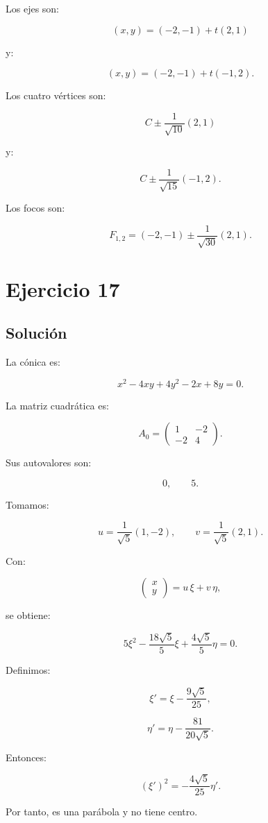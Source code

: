 \documentclass[11pt,a4paper]{article}
\begin{document}
Los ejes son:

\[
\boxed{
(x,y)
=
(-2,-1)
+
t(2,1)
}
\]

y:

\[
\boxed{
(x,y)
=
(-2,-1)
+
t(-1,2).
}
\]

Los cuatro vértices son:

\[
\boxed{
C\pm
\frac1{\sqrt{10}}(2,1)
}
\]

y:

\[
\boxed{
C\pm
\frac1{\sqrt{15}}(-1,2).
}
\]

Los focos son:

\[
\boxed{
F_{1,2}
=
(-2,-1)
\pm
\frac1{\sqrt{30}}(2,1).
}
\]

\section{Ejercicio 17}
\subsection{Solución}

La cónica es:

\[
x^2-4xy+4y^2-2x+8y=0.
\]

La matriz cuadrática es:

\[
A_0=
\begin{pmatrix}
1&-2\\
-2&4
\end{pmatrix}.
\]

Sus autovalores son:

\[
0,
\qquad
5.
\]

Tomamos:

\[
u=
\frac1{\sqrt5}(1,-2),
\qquad
v=
\frac1{\sqrt5}(2,1).
\]

Con:

\[
\begin{pmatrix}
x\\y
\end{pmatrix}
=
u\,\xi+v\,\eta,
\]

se obtiene:

\[
5\xi^2
-\frac{18\sqrt5}{5}\xi
+
\frac{4\sqrt5}{5}\eta
=
0.
\]

Definimos:

\[
\xi'
=
\xi-\frac{9\sqrt5}{25},
\]

\[
\eta'
=
\eta-\frac{81}{20\sqrt5}.
\]

Entonces:

\[
\boxed{
(\xi')^2
=
-\frac{4\sqrt5}{25}\eta'.
}
\]

Por tanto, es una parábola y no tiene centro.
\end{document}
